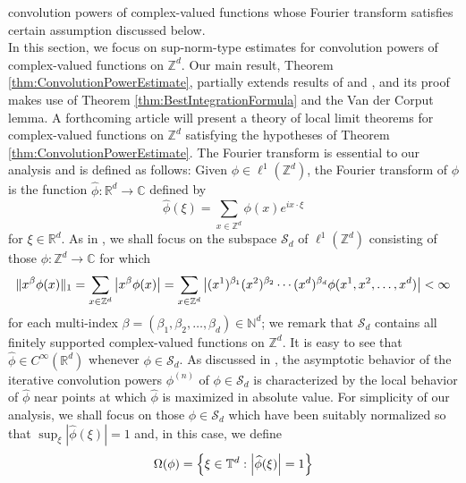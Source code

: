 \documentclass[11pt, letter]{book}
\begin{document}
convolution powers of complex-valued functions whose Fourier transform satisfies certain assumption discussed below.  \\

\noindent In this section, we focus on sup-norm-type estimates for convolution powers of complex-valued functions on $\mathbb{Z}^d$. Our main result, Theorem \ref{thm:ConvolutionPowerEstimate}, partially extends results of \cite{randles_convolution_2015} and \cite{randles_convolution_2017}, and its proof makes use of Theorem \ref{thm:BestIntegrationFormula} and the Van der Corput lemma. A forthcoming article will present a theory of local limit theorems for complex-valued functions on $\mathbb{Z}^d$ satisfying the hypotheses of Theorem \ref{thm:ConvolutionPowerEstimate}. The Fourier transform is essential to our analysis and is defined as follows: Given $\phi\in\ell^1(\mathbb{Z}^d)$, the Fourier transform of $\phi$ is the function $\widehat{\phi}:\mathbb{R}^d\to\mathbb{C}$ defined by
\begin{equation*}
    \widehat{\phi}(\xi)=\sum_{x\in\mathbb{Z}^d}\phi(x)e^{ix\cdot\xi}
\end{equation*}
for $\xi\in\mathbb{R}^d$. As in \cite{randles_convolution_2017}, we shall focus on the subspace $\mathcal{S}_d$ of $\ell^1(\mathbb{Z}^d)$ consisting of those $\phi:\mathbb{Z}^d\to\mathbb{C}$ for which
\begin{equation*}
    \|x^\beta \phi(x)\|_1=\sum_{x\in\mathbb{Z}^d}\abs{x^\beta\phi(x)}=\sum_{x\in\mathbb{Z}^d}\abs{(x^1)^{\beta_1}(x^2)^{\beta_2}\cdots(x^d)^{\beta_d}\phi(x^1,x^2,\dots,x^d)}<\infty
\end{equation*}
for each multi-index $\beta=(\beta_1,\beta_2,\dots,\beta_d)\in\mathbb{N}^d$; we remark that $\mathcal{S}_d$ contains all finitely supported complex-valued functions on $\mathbb{Z}^d$.  It is easy to see that $\widehat{\phi}\in C^\infty(\mathbb{R}^d)$ whenever $\phi\in \mathcal{S}_d$. As discussed in \cite{thomee_stability_1965,diaconis_convolution_2014,randles_convolution_2015,randles_convolution_2017}, the asymptotic behavior of the iterative convolution powers $\phi^{(n)}$ of $\phi\in\mathcal{S}_d$ is characterized by the local behavior of $\widehat{\phi}$ near points at which $\widehat{\phi}$ is maximized in absolute value. For simplicity of our analysis, we shall focus on those $\phi\in\mathcal{S}_d$ which have been suitably normalized so that $\sup_{\xi}|\widehat{\phi}(\xi)|=1$ and, in this case, we define
\begin{equation*}
    \Omega(\phi)=\left\{\xi\in \mathbb{T}^d:\abs{\widehat{\phi}(\xi)}=1\right\}
\end{equation*}
\end{document}
